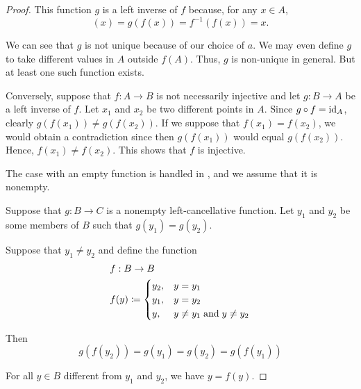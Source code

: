 \begin{proof}
  This function \( g \) is a left inverse of \( f \) because, for any \( x \in A \),
  \begin{equation*}
    [g \bincirc f](x)
    =
    g(f(x))
    =
    f^{-1}(f(x))
    =
    x.
  \end{equation*}

  We can see that \( g \) is not unique because of our choice of \( a \). We may even define \( g \) to take different values in \( A \) outside \( f(A) \). Thus, \( g \) is non-unique in general. But at least one such function exists.

  \NecessitySubProof Conversely, suppose that \( f: A \to B \) is not necessarily injective and let \( g: B \to A \) be a left inverse of \( f \). Let \( x_1 \) and \( x_2 \) be two different points in \( A \). Since \( g \bincirc f = \id_A \), clearly \( g(f(x_1)) \neq g(f(x_2)) \). If we suppose that \( f(x_1) = f(x_2) \), we would obtain a contradiction since then \( g(f(x_1)) \) would equal \( g(f(x_2)) \). Hence, \( f(x_1) \neq f(x_2) \). This shows that \( f \) is injective.


  \SufficiencySubProof* The case with an empty function is handled in , and we assume that it is nonempty.

  Suppose that \( g: B \to C \) is a nonempty left-cancellative function. Let \( y_1 \) and \( y_2 \) be some members of \( B \) such that \( g(y_1) = g(y_2) \).

  Suppose that \( y_1 \neq y_2 \) and define the function
  \begin{equation*}
    \begin{aligned}
      &f: B \to B \\
      &f(y) \coloneqq \begin{cases}
        y_2, &y = y_1 \\
        y_1, &y = y_2 \\
        y,   &y \neq y_1 \T{and} y \neq y_2
      \end{cases}
    \end{aligned}
  \end{equation*}

  Then
  \begin{equation*}
    g(f(y_2)) = g(y_1) = g(y_2) = g(f(y_1))
  \end{equation*}

  For all \( y \in B \) different from \( y_1 \) and \( y_2 \), we have \( y = f(y) \).


\end{proof}
